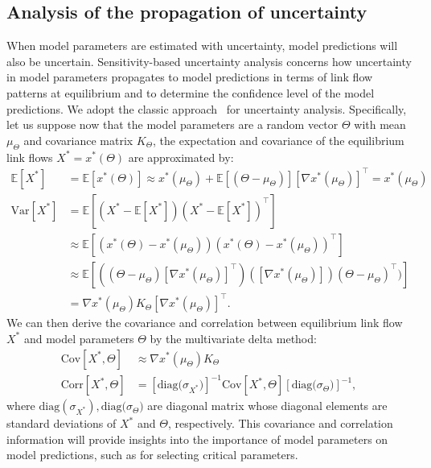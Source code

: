 \documentclass[a4paper,11pt]{article}
\begin{document}
\subsection{Analysis of the propagation of uncertainty}
When model parameters are estimated with uncertainty, model predictions will also be uncertain.
Sensitivity-based uncertainty analysis concerns how uncertainty in model parameters propagates to model predictions in terms of link flow patterns at equilibrium and to determine the confidence level of the model predictions. We adopt the classic approach~\citep[e.g., applied in][]{yang2013sensitivity} for uncertainty analysis. Specifically, let us suppose now that the model parameters are a random vector $\Theta$ with mean $\mu_{\Theta}$ and covariance matrix $K_{\Theta}$,
the expectation and covariance of the equilibrium link flows $X^*=x^*(\Theta)$ are approximated by:
\begin{align}
    \mathbb{E}[X^*] &= \mathbb{E}[x^*(\Theta)]\approx x^*(\mu_{\Theta}) + \mathbb{E}[(\Theta - \mu_{\Theta})] [\nabla x^*(\mu_{\Theta})]^\top = x^*(\mu_{\Theta}) \\
    \text{Var}[X^*] &= \mathbb{E}[(X^* - \mathbb{E}[X^*])(X^* - \mathbb{E}[X^*])^\top] \nonumber \\
    &\approx \mathbb{E}[(x^*(\Theta) - x^*(\mu_{\Theta}))(x^*(\Theta) - x^*(\mu_{\Theta}))^\top] \nonumber \\
    &\approx \mathbb{E}[((\Theta - \mu_{\Theta})[\nabla x^*(\mu_{\Theta})]^\top )([\nabla x^*(\mu_{\Theta})])(\Theta - \mu_{\Theta})^\top)] \nonumber \\
    & = \nabla x^*(\mu_{\Theta}) K_\Theta [\nabla x^*(\mu_{\Theta})]^\top. \label{eq:uncertainty_cov}
\end{align}
We can then derive the covariance and correlation between equilibrium link flow $X^*$ and model parameters $\Theta$ by the multivariate delta method:
\begin{align}
 \text{Cov}[X^*, \Theta] &\approx \nabla x^*(\mu_{\Theta}) K_\Theta \\
 \text{Corr}[X^*, \Theta] &= [\text{diag(}\sigma_{X^*})]^{-1} \text{Cov}[X^*, \Theta] [\text{diag(}\sigma_{\Theta})]^{-1},
\end{align}
where $\text{diag}(\sigma_{X^*}), \text{diag(}\sigma_{\Theta})$ are diagonal matrix whose diagonal elements are standard deviations of $X^*$ and $\Theta$, respectively. This covariance and correlation information will provide insights into the importance of model parameters on model predictions, such as for selecting critical parameters.
\end{document}
